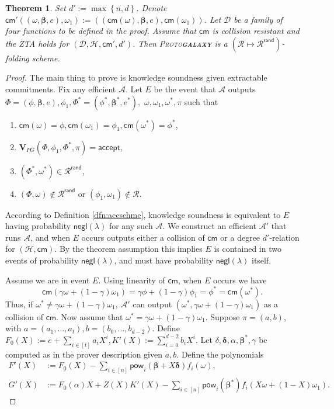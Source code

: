 \documentclass[11pt]{article} %
\newcommand{\protogal}{{\scshape Proto\bfseries{galaxy}}\xspace}
\newcommand{\adv}{\ensuremath{\mathcal A}\xspace}
\newcommand{\advprime}{\ensuremath{\mathcal{A}'}\xspace}
\newcommand{\cm}{\ensuremath{\mathsf{cm}}\xspace}
\newcommand{\negl}{\ensuremath{\mathsf{negl}(\lambda)}\xspace}
\newcommand{\acc}{\ensuremath{\mathsf{accept}}\xspace}
\newcommand{\defeq}{:=}
\newcommand{\hash}{\ensuremath{\mathcal{H}}\xspace}
\newcommand{\prf}{\ensuremath{\mathsf{\pi}}\xspace}
\newcommand{\inst}{\ensuremath{\phi}\xspace}
\newcommand{\wit}{\ensuremath{\mathsf{\omega}}\xspace}
\newcommand{\ver}{\ensuremath{\mathsf{\mathbf{V}}}\xspace}
\newcommand{\verpg}{\ensuremath{\ver_{PG}}\xspace}
\newcommand{\rel}{\ensuremath{\mathcal{R}}\xspace}
\newcommand{\relrand}{\ensuremath{\mathcal{R^{\mathsf{rand}}}}\xspace}
\newcommand{\set}[1]{\ensuremath{\left\{#1\right\}}\xspace}
\newtheorem{thm}[lemma]{Theorem}
\newcommand{\betaa}{\ensuremath{\mathbf{\boldsymbol{\beta}}}\xspace}
\newcommand{\deltaa}{\ensuremath{\mathbf{\boldsymbol{\delta}}}\xspace}
\newcommand{\instt}{\ensuremath{\Phi^*}\xspace}
\newcommand{\insttbase}{\ensuremath{\Phi}\xspace}
\newcommand{\pow}{\ensuremath{\mathsf{pow}}\xspace}
\newcommand{\accscheme}[2]{$(#1\mapsto #2)$-folding scheme\xspace}
\newcommand{\inststar}{\ensuremath{\inst^*}\xspace}
\newcommand{\witstar}{\ensuremath{\wit^*}\xspace}
\newcommand{\ztafuncs}{\ensuremath{\mathcal{D}}\xspace}
\begin{document}
\begin{thm}\label{thm:pgsoundness}
Set $d'\defeq \max \set{n,d}$. Denote $\cm'((\wit,\betaa,e),\wit_1)\defeq ((\cm(\wit),\betaa,e),\cm(\wit_1))$.
Let \ztafuncs be a family of four functions to be defined in the proof.
Assume that \cm is collision resistant and the ZTA holds for $(\ztafuncs,\hash, \cm',d')$.
Then \protogal is a \accscheme{\rel}{\relrand}.
\end{thm}
\begin{proof}
The main thing to prove is knowledge soundness given extractable commitments.
 Fix any efficient \adv. Let $E$ be the event that \adv outputs
$\insttbase=(\inst,\betaa,e),\inst_1,\instt=(\inststar,\betaa^*,e^*),$ $\wit,\wit_1,\witstar,\prf$ such that 
\begin{enumerate}
\item $\cm(\wit)=\inst,\cm(\wit_1)=\inst_1,\cm(\witstar)=\inststar$,
\item $\verpg(\insttbase,\inst_1,\instt,\prf)=\acc$,
\item $(\instt,\witstar)\in\relrand$,
\item $(\insttbase,\wit)\notin\relrand$ or $(\inst_1,\wit_1)\notin \rel$.
\end{enumerate}
According to Definition \ref{dfn:accschme}, knowledge soundness is equivalent to $E$ having 
probability \negl for any such \adv.
We construct an efficient \advprime that runs \adv, and when $E$ occurs outputs either a collision of 
\cm or a degree $d'$-relation for $(\hash,\cm)$. By the theorem assumption this implies $E$ is contained in two events of
probability \negl, and must have probability \negl itself.

Assume we are in event $E$.
Using linearity of \cm, when $E$ occurs we have 
\[\cm( \gamma\wit+(1-\gamma)\wit_1)=\gamma \inst +(1-\gamma)\inst_1=\inststar=\cm(\witstar).\]
Thus, if $\witstar \neq \gamma \wit + (1-\gamma)\wit_1$, \advprime can output $(\witstar,\gamma\wit+(1-\gamma)\wit_1)$
as a collision of \cm.
Now assume that $\witstar = \gamma \wit + (1-\gamma)\wit_1$.
Suppose $\prf=(a,b)$, with $a=(a_1,\ldots,a_t),b= (b_0,\ldots,b_{d-2})$.
Define $F_0(X)\defeq e+\sum_{i\in [t]} a_iX^i,K'(X)\defeq \sum_{i=0}^{d-2} b_iX^i$.
Let $\delta,\deltaa,\alpha,\betaa^*, \gamma$ be computed as in the prover description given $a,b$.
Define the polynomials
\begin{align*}
F'(X) &\defeq F_0(X)-\sum_{i\in [n]} \pow_i(\betaa+X\deltaa) f_i(\wit), \\
G'(X) &\defeq F_0(\alpha)X+ Z(X)K'(X)-\sum_{i\in [n]}\pow_i( \betaa^*) f_i(X\wit +(1-X)\wit_1).
\end{align*}


\end{proof}
\end{document}
